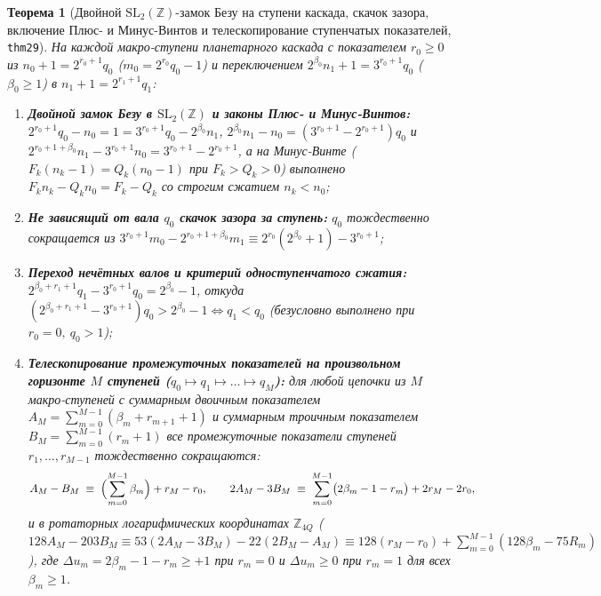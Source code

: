 \documentclass[11pt,a4paper]{article}
\newtheorem{theorem}{Теорема}[section]
\theoremstyle{definition}
\theoremstyle{remark}
\begin{document}
\begin{theorem}[Двойной $\mathrm{SL}_2(\mathbb{Z})$-замок Безу на ступени каскада, скачок зазора, включение Плюс- и Минус-Винтов и телескопирование ступенчатых показателей, \texttt{thm29}]
\label{thm:odd-core-dynamics}
На каждой макро-ступени планетарного каскада с показателем $r_0 \ge 0$ из $n_0 + 1 = 2^{r_0 + 1} q_0$ ($m_0 = 2^{r_0} q_0 - 1$) и переключением $2^{\beta_0} n_1 + 1 = 3^{r_0 + 1} q_0$ ($\beta_0 \ge 1$) в $n_1 + 1 = 2^{r_1 + 1} q_1$:
\begin{enumerate}[label=\textbf{(\roman*)},leftmargin=*,noitemsep]
\item \textbf{Двойной замок Безу в $\mathrm{SL}_2(\mathbb{Z})$ и законы Плюс- и Минус-Винтов:} $2^{r_0 + 1} q_0 - n_0 = 1 = 3^{r_0 + 1} q_0 - 2^{\beta_0} n_1$, $2^{\beta_0} n_1 - n_0 = (3^{r_0 + 1} - 2^{r_0 + 1}) q_0$ и $2^{r_0 + 1 + \beta_0} n_1 - 3^{r_0 + 1} n_0 = 3^{r_0 + 1} - 2^{r_0 + 1}$, а на Минус-Винте ($F_k(n_k - 1) = Q_k(n_0 - 1)$ при $F_k > Q_k > 0$) выполнено $F_k n_k - Q_k n_0 = F_k - Q_k$ со строгим сжатием $n_k < n_0$;
\item \textbf{Не зависящий от вала $q_0$ скачок зазора за ступень:} $q_0$ тождественно сокращается из $3^{r_0 + 1} m_0 - 2^{r_0 + 1 + \beta_0} m_1 \equiv 2^{r_0}(2^{\beta_0} + 1) - 3^{r_0 + 1}$;
\item \textbf{Переход нечётных валов и критерий одноступенчатого сжатия:} $2^{\beta_0 + r_1 + 1} q_1 - 3^{r_0 + 1} q_0 = 2^{\beta_0} - 1$, откуда $(2^{\beta_0 + r_1 + 1} - 3^{r_0 + 1}) q_0 > 2^{\beta_0} - 1 \iff q_1 < q_0$ (безусловно выполнено при $r_0 = 0,\ q_0 > 1$);
\item \textbf{Телескопирование промежуточных показателей на произвольном горизонте $M$ ступеней ($q_0 \mapsto q_1 \mapsto \dots \mapsto q_M$):} для любой цепочки из $M$ макро-ступеней с суммарным двоичным показателем $A_M = \sum_{m=0}^{M-1}(\beta_m + r_{m+1} + 1)$ и суммарным троичным показателем $B_M = \sum_{m=0}^{M-1}(r_m + 1)$ все промежуточные показатели ступеней $r_1,\dots,r_{M-1}$ тождественно сокращаются:
  \[
    A_M - B_M \;\equiv\; \Bigl(\sum_{m=0}^{M-1}\beta_m\Bigr) + r_M - r_0, \qquad
    2 A_M - 3 B_M \;\equiv\; \sum_{m=0}^{M-1}\bigl(2\beta_m - 1 - r_m\bigr) + 2 r_M - 2 r_0,
  \]
  и в ротаторных логарифмических координатах $\mathbb{Z}_{4Q}$ ($128 A_M - 203 B_M \equiv 53(2 A_M - 3 B_M) - 22(2 B_M - A_M) \equiv 128(r_M - r_0) + \sum_{m=0}^{M-1}(128\beta_m - 75 R_m)$), где $\Delta u_m = 2\beta_m - 1 - r_m \ge +1$ при $r_m = 0$ и $\Delta u_m \ge 0$ при $r_m = 1$ для всех $\beta_m \ge 1$.
\end{enumerate}
\end{theorem}
\end{document}
